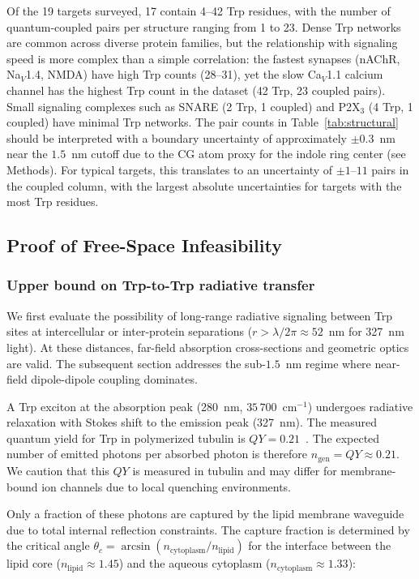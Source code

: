 \documentclass[aps,pre,twocolumn,showpacs,superscriptaddress]{revtex4-2}
\begin{document}
Of the 19 targets surveyed, 17 contain 4--42 Trp residues, with the number of quantum-coupled pairs per structure ranging from 1 to 23. Dense Trp networks are common across diverse protein families, but the relationship with signaling speed is more complex than a simple correlation: the fastest synapses (nAChR, Na$_V$1.4, NMDA) have high Trp counts (28--31), yet the slow Ca$_V$1.1 calcium channel has the highest Trp count in the dataset (42 Trp, 23 coupled pairs). Small signaling complexes such as SNARE (2 Trp, 1 coupled) and P2X$_3$ (4 Trp, 1 coupled) have minimal Trp networks. The pair counts in Table~\ref{tab:structural} should be interpreted with a boundary uncertainty of approximately $\pm 0.3$~nm near the $1.5$~nm cutoff due to the CG atom proxy for the indole ring center (see Methods). For typical targets, this translates to an uncertainty of $\pm 1$--$11$ pairs in the coupled column, with the largest absolute uncertainties for targets with the most Trp residues.

\subsection{Proof of Free-Space Infeasibility}

\subsubsection{Upper bound on Trp-to-Trp radiative transfer}

We first evaluate the possibility of long-range radiative signaling between Trp sites at intercellular or inter-protein separations ($r > \lambda/2\pi \approx 52$~nm for 327~nm light). At these distances, far-field absorption cross-sections and geometric optics are valid. The subsequent section addresses the sub-$1.5$~nm regime where near-field dipole-dipole coupling dominates.

A Trp exciton at the absorption peak (280~nm, $35\,700$~cm$^{-1}$) undergoes radiative relaxation with Stokes shift to the emission peak (327~nm). The measured quantum yield for Trp in polymerized tubulin is $QY = 0.21$~\cite{Babcock2024}. The expected number of emitted photons per absorbed photon is therefore $n_{\mathrm{gen}} = QY \approx 0.21$. We caution that this $QY$ is measured in tubulin and may differ for membrane-bound ion channels due to local quenching environments.

Only a fraction of these photons are captured by the lipid membrane waveguide due to total internal reflection constraints. The capture fraction is determined by the critical angle $\theta_c = \arcsin(n_{\mathrm{cytoplasm}} / n_{\mathrm{lipid}})$ for the interface between the lipid core ($n_{\mathrm{lipid}} \approx 1.45$) and the aqueous cytoplasm ($n_{\mathrm{cytoplasm}} \approx 1.33$):
\end{document}
